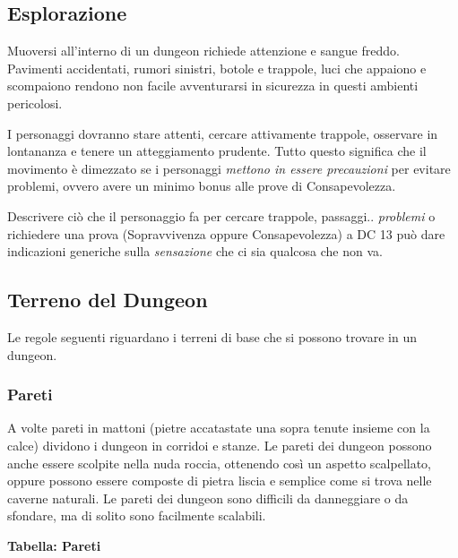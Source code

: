 \begin{multicols}{2}
\subsection{Esplorazione}

Muoversi all'interno di un dungeon richiede attenzione e sangue freddo. Pavimenti accidentati, rumori sinistri, botole e trappole, luci che appaiono e scompaiono rendono non facile avventurarsi in sicurezza in questi ambienti pericolosi.

I personaggi dovranno stare attenti, cercare attivamente trappole, osservare in lontananza e tenere un atteggiamento prudente. Tutto questo significa che il movimento è dimezzato se i personaggi \emph{mettono in essere precauzioni} per evitare problemi, ovvero avere un minimo bonus alle prove di Consapevolezza.

Descrivere ciò che il personaggio fa per cercare trappole, passaggi.. \emph{problemi} o richiedere una prova (Sopravvivenza oppure Consapevolezza) a DC 13 può dare indicazioni generiche sulla \emph{sensazione} che ci sia qualcosa che non va.

\subsection{Terreno del Dungeon}

Le regole seguenti riguardano i terreni di base che si possono trovare in un dungeon.

\subsubsection{Pareti}\label{pareti}\hypertarget{pareti}{}

A volte pareti in mattoni (pietre accatastate una sopra tenute insieme con la calce) dividono i dungeon in corridoi e stanze. Le pareti dei dungeon possono anche essere scolpite nella nuda roccia, ottenendo così un aspetto scalpellato, oppure possono essere composte di pietra liscia e semplice come si trova nelle caverne naturali. Le pareti dei dungeon sono difficili da danneggiare o da sfondare, ma di solito sono facilmente scalabili.

\end{multicols}
\textbf{Tabella: Pareti}
\medskip

